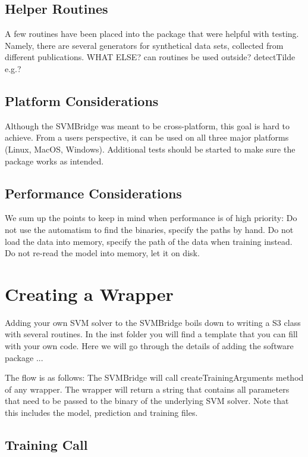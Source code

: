 \documentclass[article, shortnames]{jss}
\begin{document}
\subsection{Helper  Routines}

A few routines have been placed into the package that were helpful
with testing. Namely, there are several generators for synthetical data sets,
collected from different publications. 
WHAT ELSE? can routines be used outside? detectTilde e.g.?


\subsection{Platform Considerations}

Although the SVMBridge was meant to be cross-platform, this goal
is hard to achieve. From a users perspective, it can be used on all three
major platforms (Linux, MacOS, Windows). Additional tests should
be started to make sure the package works as intended.


\subsection{Performance Considerations}

We sum up the points to keep in mind when performance is of high priority:
Do not use the automatism to find the binaries, specify the paths by hand.
Do not load the data into memory, specify the path of the data when training instead.
Do not re-read the model into memory, let it on disk.



\section{Creating a Wrapper}

Adding your own SVM solver to the SVMBridge boils down to
writing a S3 class with several routines. In the inst folder you will find
a template that you can fill with your own code. Here we will go
through the details of adding the software package ...

The flow is as follows: The SVMBridge will call 
createTrainingArguments method of any wrapper. The wrapper
will return a string that contains all parameters that need to be
passed to the binary of the underlying SVM solver. Note that
this includes the model, prediction and training files.



\subsection{Training Call}
\end{document}
